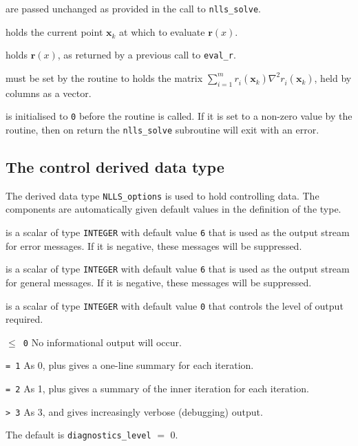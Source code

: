\documentclass{spec}
\newcommand{\vx}{ {\bm x} } %
\newcommand{\vr}{ {\bm r} } %
\newcommand{\iter}[2][k]{ #2_{#1}^{}} %
\newcommand{\comp}[2][i]{ #2_{#1}^{}} %
\begin{document}
\begin{description}
    are passed unchanged as provided in the call to
      {\tt nlls\_solve}.

    holds the current point $\iter{\vx}$ at which to evaluate $\vr(x)$.
  
    holds $\vr(x)$, as returned by a previous call to \texttt{eval\_r}.

    must be set by the routine to holds the matrix
      $\sum_{i = 1}^m \comp{r}(\iter{\vx})\nabla^2\comp{r}(\iter{\vx})$, held
      by columns as a vector.

    is initialised to \texttt{0} before the routine is called.
      If it is set to a non-zero value by the routine, then on return
      the {\tt nlls\_solve} subroutine will exit with an error.
\end{description}



\subsection{The control derived data type}
\label{typecontrol} 

The derived data type {\tt NLLS\_options} 
is used to hold controlling data. The components  are automatically 
given default values in the definition of the type.

\vspace{2mm}

\begin{description}

 is a scalar of type {\tt INTEGER} with default value {\tt 6} that
is used as the output stream for error messages. If it is negative, these
messages will be suppressed.  

 is a scalar of type {\tt INTEGER} with default value {\tt 6}
that is used as the output stream for general messages. If it is negative, these messages will be suppressed. 

 is a scalar of type {\tt INTEGER} with default value {\tt 0} that 
controls the level of output required. 
\begin{description} 
\item{\tt $\leq$ 0} No informational output will occur.
\item{\tt = 1} As 0, plus gives a one-line summary for each iteration.
\item{\tt = 2} As 1, plus gives a summary of the inner iteration for each iteration.
\item{\tt > 3} As 3, and gives increasingly verbose (debugging) output.
\end{description}
The default is {\tt diagnostics\_level} $=$ 0.
\end{description}
\end{document}
